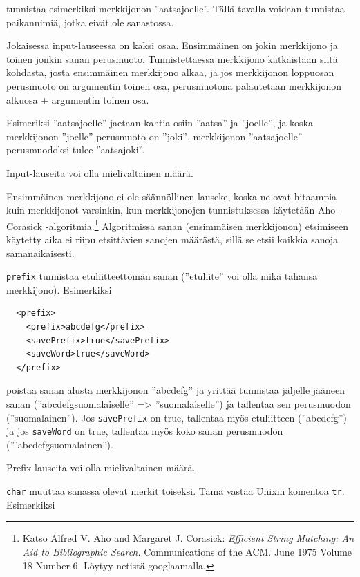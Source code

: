 \documentclass[12pt]{article}
\begin{document}
tunnistaa esimerkiksi merkkijonon ''aatsajoelle''. Tällä tavalla
voidaan tunnistaa paikannimiä, jotka eivät ole sanastossa.

Jokaisessa input-lauseessa on kaksi osaa. Ensimmäinen on jokin
merkkijono ja toinen jonkin sanan perusmuoto. Tunnistettaessa
merkkijono katkaistaan siitä kohdasta, josta ensimmäinen merkkijono
alkaa, ja jos merkkijonon loppuosan perusmuoto on argumentin toinen
osa, perusmuotona palautetaan merkkijonon alkuosa + argumentin toinen
osa.

Esimeriksi ''aatsajoelle'' jaetaan kahtia osiin ''aatsa'' ja
''joelle'', ja koska merkkijonon ''joelle'' perusmuoto on ''joki'',
merkkijonon ''aatsajoelle'' perusmuodoksi tulee ''aatsajoki''.

Input-lauseita voi olla mielivaltainen määrä.

Ensimmäinen merkkijono ei ole säännöllinen lauseke, koska ne ovat
hitaampia kuin merkkijonot varsinkin, kun merkkijonojen tunnistuksessa
käytetään Aho-Corasick -algoritmia.\footnote{Katso
Alfred V. Aho and Margaret J. Corasick:
\emph{Efficient String Matching: An Aid to Bibliographic Search.}
Communications of the ACM. June 1975 Volume 18 Number 6.
Löytyy netistä googlaamalla.} Algoritmissa sanan (ensimmäisen
merkkijonon) etsimiseen käytetty aika ei riipu etsittävien sanojen
määrästä, sillä se etsii kaikkia sanoja samanaikaisesti.



\bigskip
\verb|prefix| tunnistaa etuliitteettömän sanan (''etuliite'' voi olla
mikä tahansa merkkijono). Esimerkiksi

\begin{verbatim}
  <prefix>
    <prefix>abcdefg</prefix>
    <savePrefix>true</savePrefix>
    <saveWord>true</saveWord>
  </prefix>
\end{verbatim}

poistaa sanan alusta merkkijonon ''abcdefg'' ja yrittää tunnistaa
jäljelle jääneen sanan (''abcdefgsuomalaiselle'' => ''suomalaiselle'')
ja tallentaa sen perusmuodon (''suomalainen''). Jos \verb|savePrefix|
on true, tallentaa myös etuliitteen (''abcdefg'') ja jos
\verb|saveWord| on true, tallentaa myös koko sanan perusmuodon
('''abcdefgsuomalainen'').

Prefix-lauseita voi olla mielivaltainen määrä.



\bigskip
\verb|char| muuttaa sanassa olevat merkit toiseksi. Tämä vastaa Unixin
komentoa \verb|tr|. Esimerkiksi
\end{document}
